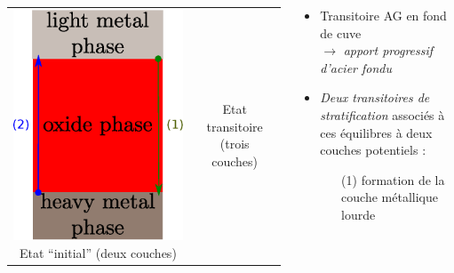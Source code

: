 \begin{frame}
\begin{columns}[T]
\begin{column}{0.5\textwidth}
\begin{tabularx}{\textwidth}{CC}
    \includegraphics[height=0.30\textheight]{Figures/schema_stratif_3.eps} \n
    \tiny Etat ``initial'' (deux couches) & \tiny Etat transitoire (trois couches)
    \end{tabularx}
  \end{column}
  \begin{column}{0.55\textwidth} 
    \hskip -0.7cm \begin{minipage}{1.1\textwidth}
  \begin{itemize}
\item Transitoire AG en fond de cuve \\ $\rightarrow$ \emph{apport progressif d'acier fondu}
\item \emph{Deux transitoires de stratification} associés à ces équilibres à deux couches potentiels :
\begin{itemize}
\item[\textcolor{OliveGreen}{(1)}] formation de la couche métallique lourde \\

\end{itemize}
\end{itemize}
\end{minipage}
\end{column}
\end{columns}
\end{frame}
